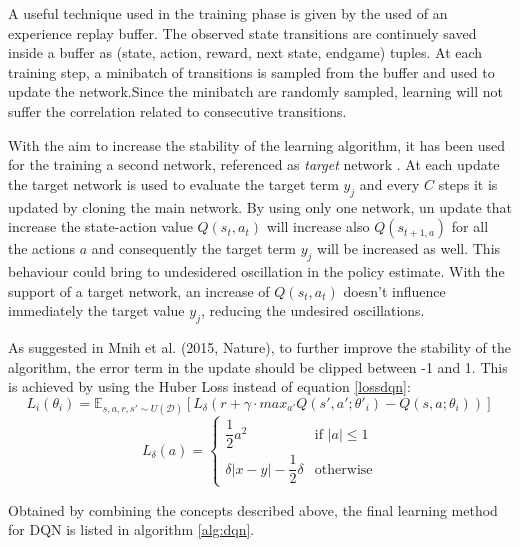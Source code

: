 \documentclass[article,11pt]{article}
\begin{document}
	A useful technique used in the training phase is given by the used of an experience replay buffer. The observed state transitions  are continuely saved inside a buffer as (state, action, reward, next state, endgame) tuples. At each training step, a minibatch of transitions is sampled from the buffer and used to update the network.Since the minibatch are randomly sampled, learning will not suffer the correlation related to consecutive transitions.
	
	With the aim to increase the stability of the learning algorithm, it has been used for the training a second network, referenced as \textit{target} network \cite{dqn2015}. At each update the target network is used to evaluate the target term $y_j$ and every $C$ steps it is updated by cloning the main network. By using only one network, un update that increase the state-action value $Q(s_t, a_t)$ will increase also $Q(s_{t+1, a})$ for all the actions $a$ and consequently the target term $y_j$ will be increased as well. This behaviour could bring to undesidered oscillation in the policy estimate.  With the support of a target network, an increase of $Q(s_t, a_t)$ doesn't influence immediately the target value $y_j$, reducing the undesired oscillations.
	
	As suggested in Mnih et al. (2015, Nature), to further improve the stability of the algorithm,  the error term in the update should be clipped between -1 and 1. This is achieved by using the Huber Loss instead of equation \ref{lossdqn}:
	\begin{equation}
	L_i(\theta_i) = \mathbb{E}_{s,a,r,s'\sim U(\mathcal{D})} \left[L_\delta \left( r + \gamma\cdot max_{a'}Q(s',a'; \theta'_i) - Q(s,a;\theta_i) \right) \right]
	\end{equation}
	\begin{equation}
	L_{\delta}(a)  = 
	\begin{cases}
	\dfrac{1}{2}a^2 & \text{if $|a| \leq 1$}\\
	\delta|x-y| - \dfrac{1}{2}\delta & \text{otherwise}
	\end{cases}
	\end{equation}
	
	Obtained by combining the concepts described above, the final learning method for DQN is listed in algorithm \ref{alg:dqn}.
	
\end{document}
